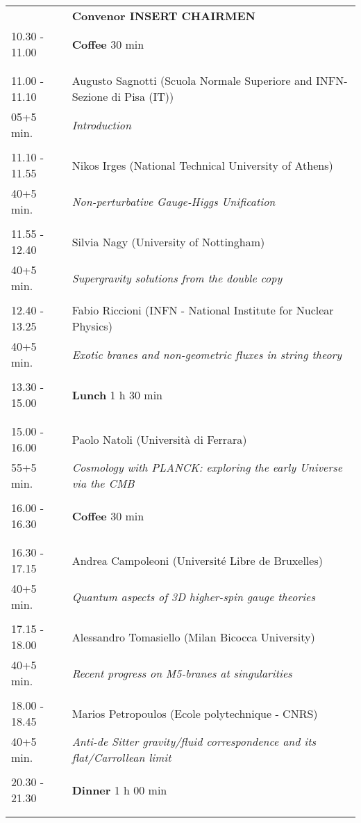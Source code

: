 \begin{longtable}{p{3cm}p{13cm}}
&\hfill {\bf Convenor INSERT CHAIRMEN }\\ 
10.30 - 11.00 & {\bf Coffee} \hfill 30 min \\ 
 & \\ 
 & \\ 
11.00 - 11.10 & Augusto Sagnotti (Scuola Normale Superiore and INFN-Sezione di Pisa (IT))\\ 
05+5 min. & {\it Introduction}\\ 
 & \\ 
11.10 - 11.55 & Nikos Irges (National Technical University of Athens)\\ 
40+5 min. & {\it Non-perturbative Gauge-Higgs Unification}\\ 
 & \\ 
11.55 - 12.40 & Silvia Nagy (University of Nottingham)\\ 
40+5 min. & {\it Supergravity solutions from the double copy}\\ 
 & \\ 
12.40 - 13.25 & Fabio Riccioni (INFN - National Institute for Nuclear Physics)\\ 
40+5 min. & {\it Exotic branes and non-geometric fluxes in string theory}\\ 
 & \\ 
13.30 - 15.00 & {\bf Lunch} \hfill 1 h 30 min \\ 
 & \\ 
 & \\ 
15.00 - 16.00 & Paolo Natoli (Università di Ferrara)\\ 
55+5 min. & {\it Cosmology with PLANCK: exploring the early Universe via the CMB}\\ 
 & \\ 
16.00 - 16.30 & {\bf Coffee} \hfill 30 min \\ 
 & \\ 
 & \\ 
16.30 - 17.15 & Andrea Campoleoni (Université Libre de Bruxelles)\\ 
40+5 min. & {\it Quantum aspects of 3D higher-spin gauge theories}\\ 
 & \\ 
17.15 - 18.00 & Alessandro Tomasiello (Milan Bicocca University)\\ 
40+5 min. & {\it Recent progress on M5-branes at singularities}\\ 
 & \\ 
18.00 - 18.45 & Marios Petropoulos (Ecole polytechnique - CNRS)\\ 
40+5 min. & {\it Anti-de Sitter gravity/fluid correspondence and its flat/Carrollean limit}\\ 
 & \\ 
20.30 - 21.30 & {\bf Dinner} \hfill 1 h 00 min \\ 
 & \\ 
 & \\ 
\end{longtable}


